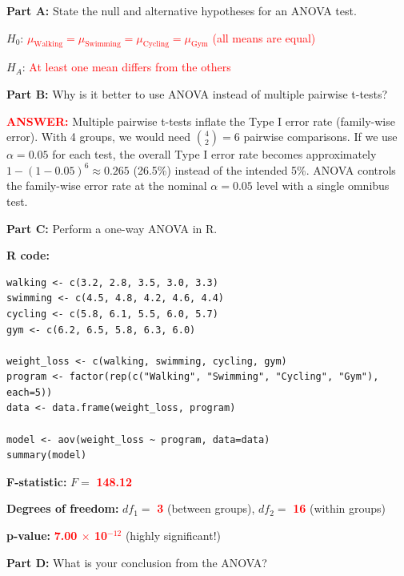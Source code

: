 \documentclass[11pt]{article}
\begin{document}
\vspace{6pt}

\textbf{Part A:} State the null and alternative hypotheses for an ANOVA test.

$H_0$: \textcolor{red}{$\mu_{\text{Walking}} = \mu_{\text{Swimming}} = \mu_{\text{Cycling}} = \mu_{\text{Gym}}$ (all means are equal)}

$H_A$: \textcolor{red}{At least one mean differs from the others}

\vspace{0.5cm}

\textbf{Part B:} Why is it better to use ANOVA instead of multiple pairwise t-tests?

\textcolor{red}{\textbf{ANSWER:}} Multiple pairwise t-tests inflate the Type I error rate (family-wise error). With 4 groups, we would need ${4 \choose 2} = 6$ pairwise comparisons. If we use $\alpha = 0.05$ for each test, the overall Type I error rate becomes approximately $1 - (1-0.05)^6 \approx 0.265$ (26.5\%) instead of the intended 5\%. ANOVA controls the family-wise error rate at the nominal $\alpha = 0.05$ level with a single omnibus test.

\vspace{0.5cm}

\textbf{Part C:} Perform a one-way ANOVA in R.

\textbf{R code:}
\begin{lstlisting}
walking <- c(3.2, 2.8, 3.5, 3.0, 3.3)
swimming <- c(4.5, 4.8, 4.2, 4.6, 4.4)
cycling <- c(5.8, 6.1, 5.5, 6.0, 5.7)
gym <- c(6.2, 6.5, 5.8, 6.3, 6.0)

weight_loss <- c(walking, swimming, cycling, gym)
program <- factor(rep(c("Walking", "Swimming", "Cycling", "Gym"), each=5))
data <- data.frame(weight_loss, program)

model <- aov(weight_loss ~ program, data=data)
summary(model)
\end{lstlisting}

\textbf{F-statistic:} $F = $ \textcolor{red}{\textbf{148.12}}

\textbf{Degrees of freedom:} $df_1 = $ \textcolor{red}{\textbf{3}} (between groups), $df_2 = $ \textcolor{red}{\textbf{16}} (within groups)

\textbf{p-value:} \textcolor{red}{\textbf{7.00 $\times$ 10$^{-12}$}} (highly significant!)

\vspace{0.5cm}

\textbf{Part D:} What is your conclusion from the ANOVA?
\end{document}
